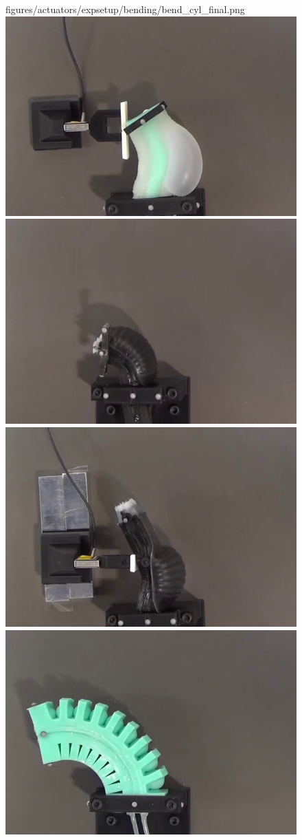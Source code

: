 \begin{figure}
{{figures/actuators/expsetup/bending/bend_cyl_final.png}
\label{bend_cyl_fin}}
{\includegraphics[width=0.47\columnwidth, trim = 30mm 0mm 65mm 50mm, clip]
{figures/actuators/expsetup/force/force_cyl_final.png}
\label{force_cyl_fin}}
%
{\includegraphics[width=0.47\columnwidth, trim = 45mm 20mm 80mm 74mm, clip]
{figures/actuators/expsetup/bending/bend_ribbed_final.png}
\label{bend_ribbed_final}}
{\includegraphics[width=0.47\columnwidth, trim = 45mm 2mm 75mm 85mm, clip]
{figures/actuators/expsetup/force/force_ribbed_final.png}
\label{force_ribbed_fin}}
%
{\includegraphics[width=0.47\columnwidth, trim = 15mm 20mm 85mm 40mm, clip]
{figures/actuators/expsetup/bending/bend_pleat_final.png}
\label{bend_pleat_final}}

\end{figure}
